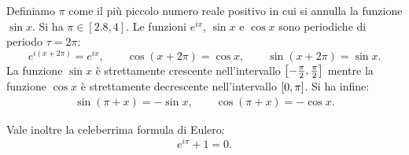 \begin{theorem}[definizione di $\pi$]
%
%
\label{th:pi}%
\mynote{$\pi$}%
Definiamo $\pi$ come il più piccolo numero reale
positivo in cui si annulla la funzione $\sin x$.
Si ha $\pi \in [2.8,4]$.
Le funzioni $e^{ix}$, $\sin x$ e $\cos x$ sono
periodiche di periodo $\tau = 2\pi$:
\mynote{$\tau$}%
\[
  e^{i(x+2\pi)} = e^{ix}, \qquad
  \cos(x + 2\pi) = \cos x, \qquad
  \sin(x + 2\pi) = \sin x.
\]
La funzione $\sin x$ è strettamente crescente nell'intervallo
$\left[-\frac \pi 2,\frac \pi 2\right]$
mentre la funzione $\cos x$ è strettamente decrescente 
nell'intervallo $\left[0,\pi\right]$.
Si ha infine:
\begin{align*}
\sin(\pi + x) = -\sin x, \qquad 
\cos(\pi + x) = -\cos x.
\end{align*}

Vale inoltre la celeberrima formula di Eulero:
%
%
\[
  e^{i\pi} + 1 = 0.
\]
\end{theorem}
